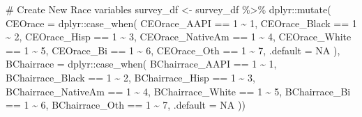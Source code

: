 \documentclass[
  letterpaper,
]{scrbook}
\newenvironment{Shaded}{\begin{snugshade}}{\end{snugshade}}
\newcommand{\AttributeTok}[1]{\textcolor[rgb]{0.40,0.45,0.13}{#1}}
\newcommand{\CommentTok}[1]{\textcolor[rgb]{0.37,0.37,0.37}{#1}}
\newcommand{\ConstantTok}[1]{\textcolor[rgb]{0.56,0.35,0.01}{#1}}
\newcommand{\DecValTok}[1]{\textcolor[rgb]{0.68,0.00,0.00}{#1}}
\newcommand{\FunctionTok}[1]{\textcolor[rgb]{0.28,0.35,0.67}{#1}}
\newcommand{\NormalTok}[1]{\textcolor[rgb]{0.00,0.23,0.31}{#1}}
\newcommand{\OtherTok}[1]{\textcolor[rgb]{0.00,0.23,0.31}{#1}}
\newcommand{\SpecialCharTok}[1]{\textcolor[rgb]{0.37,0.37,0.37}{#1}}
\begin{document}
\begin{Shaded}
\begin{Highlighting}[]
\CommentTok{\# Create New Race variables}
\NormalTok{survey\_df }\OtherTok{\textless{}{-}}\NormalTok{ survey\_df }\SpecialCharTok{\%\textgreater{}\%}
\NormalTok{  dplyr}\SpecialCharTok{::}\FunctionTok{mutate}\NormalTok{(}
    \AttributeTok{CEOrace =}\NormalTok{ dplyr}\SpecialCharTok{::}\FunctionTok{case\_when}\NormalTok{(}
\NormalTok{      CEOrace\_AAPI }\SpecialCharTok{==} \DecValTok{1} \SpecialCharTok{\textasciitilde{}} \DecValTok{1}\NormalTok{,}
\NormalTok{      CEOrace\_Black }\SpecialCharTok{==} \DecValTok{1} \SpecialCharTok{\textasciitilde{}} \DecValTok{2}\NormalTok{,}
\NormalTok{      CEOrace\_Hisp }\SpecialCharTok{==} \DecValTok{1} \SpecialCharTok{\textasciitilde{}} \DecValTok{3}\NormalTok{,}
\NormalTok{      CEOrace\_NativeAm }\SpecialCharTok{==} \DecValTok{1} \SpecialCharTok{\textasciitilde{}} \DecValTok{4}\NormalTok{,}
\NormalTok{      CEOrace\_White }\SpecialCharTok{==} \DecValTok{1} \SpecialCharTok{\textasciitilde{}} \DecValTok{5}\NormalTok{,}
\NormalTok{      CEOrace\_Bi }\SpecialCharTok{==} \DecValTok{1} \SpecialCharTok{\textasciitilde{}} \DecValTok{6}\NormalTok{,}
\NormalTok{      CEOrace\_Oth }\SpecialCharTok{==} \DecValTok{1} \SpecialCharTok{\textasciitilde{}} \DecValTok{7}\NormalTok{,}
      \AttributeTok{.default =} \ConstantTok{NA}
\NormalTok{    ),}
    \AttributeTok{BChairrace =}\NormalTok{ dplyr}\SpecialCharTok{::}\FunctionTok{case\_when}\NormalTok{(}
\NormalTok{      BChairrace\_AAPI }\SpecialCharTok{==} \DecValTok{1} \SpecialCharTok{\textasciitilde{}} \DecValTok{1}\NormalTok{,}
\NormalTok{      BChairrace\_Black }\SpecialCharTok{==} \DecValTok{1} \SpecialCharTok{\textasciitilde{}} \DecValTok{2}\NormalTok{,}
\NormalTok{      BChairrace\_Hisp }\SpecialCharTok{==} \DecValTok{1} \SpecialCharTok{\textasciitilde{}} \DecValTok{3}\NormalTok{,}
\NormalTok{      BChairrace\_NativeAm }\SpecialCharTok{==} \DecValTok{1} \SpecialCharTok{\textasciitilde{}} \DecValTok{4}\NormalTok{,}
\NormalTok{      BChairrace\_White }\SpecialCharTok{==} \DecValTok{1} \SpecialCharTok{\textasciitilde{}} \DecValTok{5}\NormalTok{,}
\NormalTok{      BChairrace\_Bi }\SpecialCharTok{==} \DecValTok{1} \SpecialCharTok{\textasciitilde{}} \DecValTok{6}\NormalTok{,}
\NormalTok{      BChairrace\_Oth }\SpecialCharTok{==} \DecValTok{1} \SpecialCharTok{\textasciitilde{}} \DecValTok{7}\NormalTok{,}
      \AttributeTok{.default =} \ConstantTok{NA}
\NormalTok{  ))}


\end{Highlighting}
\end{Shaded}
\end{document}
